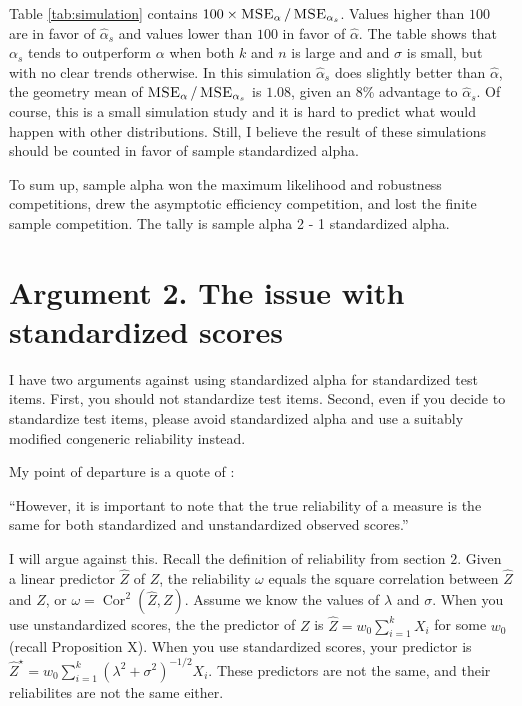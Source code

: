 \documentclass{article}
\theoremstyle{plain}
\theoremstyle{plain}
\theoremstyle{definition}
\theoremstyle{remark}
\theoremstyle{definition}
\theoremstyle{plain}
\theoremstyle{plain}
\theoremstyle{definition}
\DeclareMathOperator{\Cor}{Cor}
\DeclareMathOperator{\MSE}{\textsc{MSE}}
\begin{document}
Table \ref{tab:simulation} contains $100 \times \MSE_\alpha/\MSE_{\alpha_s}$. Values higher than $100$ are in favor of $\hat{\alpha}_s$ and values lower than $100$ in favor of $\hat{\alpha}$. The table shows that $\alpha_s$ tends to outperform $\alpha$ when both $k$ and $n$ is large and and $\sigma$ is small, but with no clear trends otherwise. In this simulation $\hat{\alpha}_s$ does slightly better than $\hat{\alpha}$, the geometry mean of $\MSE_\alpha/\MSE_{\alpha_s}$ is $1.08$, given an $8$\% advantage to $\hat{\alpha}_s$. Of course, this is a small simulation study and it is hard to predict what would happen with other distributions. Still, I believe the result of these simulations should be counted in favor of sample standardized alpha.

To sum up, sample alpha won the maximum likelihood and robustness competitions, drew the asymptotic efficiency competition, and lost the finite sample competition. The tally is sample alpha 2 - 1 standardized alpha. 



\section{Argument 2. The issue with standardized scores}
\label{sec:argument 2}
I have two arguments against using standardized alpha for standardized
test items. First, you should not standardize test items. Second,
even if you decide to standardize test items, please avoid standardized
alpha and use a suitably modified congeneric reliability instead.

My point of departure is a quote of \citet[][p.348]{Osburn2000-jd}:

\enquote{However, it is important to note that the true reliability of a measure is the same for both standardized and unstandardized observed scores.}

I will argue against this. Recall the definition of reliability from
section $2$. Given a linear predictor $\hat{Z}$ of $Z$, the
reliability $\omega$ equals the square correlation between $\hat{Z}$
and $Z$, or $\omega=\Cor^{2}(\hat{Z},Z)$. Assume
we know the values of $\lambda$ and $\sigma$. When you use unstandardized
scores, the the predictor of $Z$ is $\hat{Z}=w_{0}\sum_{i=1}^{k}X_{i}$
for some $w_{0}$ (recall Proposition X). When you use standardized
scores, your predictor is $\hat{Z}^{\star}=w_{0}\sum_{i=1}^{k}(\lambda^{2}+\sigma^{2})^{-1/2}X_{i}$.
These predictors are not the same, and their reliabilites are not
the same either.
\end{document}
